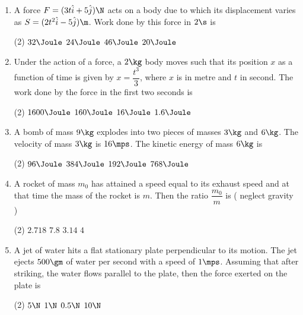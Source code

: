 \documentclass{article}
\begin{document}
\begin{enumerate}
\item A force $F=(3t\hat{i}+5\hat{j})\N$ acts on a body due to which its displacement varies as $S=(2t^2\hat{i}-5\hat{j})\m$. Work done by this force in $2\s$ is
\begin{tasks}(2)
	\task $32\Joule$
	\task $24\Joule$\ans
	\task $46\Joule$
	\task $20\Joule$
\end{tasks}

\item Under the action of a force, a $2 \kg$ body moves such that its position $x$ as a function of time is given by $x=\dfrac{t^3}{3}$, where $x$ is in metre and $t$ in second. The work done by the force in the first two seconds is
\begin{tasks}(2)
	\task $1600\Joule$
	\task $160\Joule$
	\task $16\Joule$\ans
	\task $1.6\Joule$
\end{tasks}

\item A bomb of mass $9 \kg$ explodes into two pieces of masses $3 \kg$ and $6 \kg$. The velocity of mass $3 \kg$ is $16\mps$. The kinetic energy of mass $6 \kg$ is
\begin{center}
\end{center}
\begin{tasks}(2)
	\task $96\Joule$
	\task $384\Joule$
	\task $192\Joule$\ans
	\task $768\Joule$
\end{tasks}


\item A rocket of mass $m_0$ has attained a speed equal to its exhaust speed and at that time the mass of
the rocket is $m$. Then the ratio $\dfrac{m_0}{m}$ is ( neglect gravity )
\begin{tasks}(2)
	\task $2.718$\ans
	\task $7.8$
	\task $3.14$
	\task $4$
\end{tasks}

\item A jet of water hits a flat stationary plate perpendicular to its motion. The jet ejects $500\gm$ of water per second with a speed of $1 \mps$. Assuming that after striking, the water flows parallel to the plate, then the force exerted on the plate is
\begin{tasks}(2)
	\task $5\N$
	\task $1\N$
	\task $0.5\N$\ans
	\task $10\N$
\end{tasks}


\end{enumerate}
\end{document}
